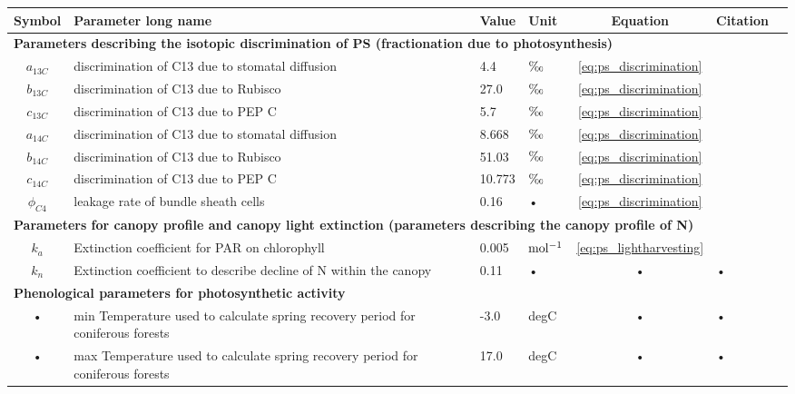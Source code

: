 \documentclass[11pt,oneside,openright,a4paper,fleqn]{book}  %
\makeatletter
\DeclareRobustCommand*\permil{\ifmmode\text{\textperthousand}\else\textperthousand\fi}
\DeclareRobustCommand*\unit[1]
 {\ensuremath{%
   {\thinmuskip3mu\relax
    \def\mu{\text{\textmu}}\def~{\,}%
    \ifx\f@series\testbx\mathbf{#1}\else\mathrm{#1}\fi}}}
\makeatother
\begin{document}
\begin{table}
\begin{tabularx}{\linewidth}{|c|X|l|l|c|l|c|} %
\hline 
Symbol & Parameter long name & Value & Unit & Equation & Citation \\
\hline 
\multicolumn{6}{l}{\bf Parameters describing the isotopic discrimination of PS (fractionation due to photosynthesis)}\\
\hline
$a_{13C}$ & discrimination of C13 due to stomatal diffusion & 4.4 & $\permil$ & \ref{eq:ps_discrimination} & \cite{Drake:2014dl} \\
$b_{13C}$ & discrimination of C13 due to Rubisco & 27.0 & $\permil$ & \ref{eq:ps_discrimination} & \cite{Drake:2014dl} \\
$c_{13C}$ & discrimination of C13 due to PEP C & 5.7 & $\permil$ & \ref{eq:ps_discrimination} & \cite{Drake:2014dl} \\
$a_{14C}$ & discrimination of C13 due to stomatal diffusion & 8.668 & $\permil$ & \ref{eq:ps_discrimination} & \cite{Drake:2014dl} \\
$b_{14C}$ & discrimination of C13 due to Rubisco & 51.03 & $\permil$ & \ref{eq:ps_discrimination} & \cite{Drake:2014dl} \\
$c_{14C}$ & discrimination of C13 due to PEP C & 10.773 & $\permil$ & \ref{eq:ps_discrimination} & \cite{Drake:2014dl} \\
$\phi_{C4}$ & leakage rate of bundle sheath cells & 0.16 & • & \ref{eq:ps_discrimination} & \cite{Drake:2014dl} \\

\hline 
\multicolumn{6}{l}{\bf Parameters for canopy profile and canopy light extinction (parameters describing the canopy profile of N)}\\
\hline
$k_a$ & Extinction coefficient for PAR on chlorophyll & 0.005 & \unit{mol^{-1}} & \ref{eq:ps_lightharvesting} & \cite{Kull:1998cr} \\
$k_n$ & Extinction coefficient to describe decline of N within the canopy & 0.11 & • & • & • \\

\hline 
\multicolumn{6}{l}{\bf Phenological parameters for photosynthetic activity}\\
\hline
• & min Temperature used to calculate spring recovery period for coniferous forests & -3.0 & degC & • & • \\
• & max Temperature used to calculate spring recovery period for coniferous forests & 17.0 & degC & • & • \\
\hline 
\end{tabularx}
\end{table}
\end{document}
